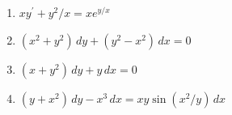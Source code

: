 \documentclass[fleqn]{article}
\begin{document}
\begin{enumerate}
    \begin{enumerate}
      \item $xy^{\prime }+y^{2}/x=xe^{y/x}$
      
      \item $\left( x^{2}+y^{2}\right) \,dy+\left( y^{2}-x^{2}\right) \,dx=0$
      
      \item $\left( x+y^{2}\right) \,dy+y\,dx=0$
      
      \item $\left( y+x^{2}\right) \,dy-x^{3}\,dx=xy \sin \left( x^{2}/y\right) \, dx$
    \end{enumerate}
  \end{enumerate}

  \pagebreak
\end{document}
